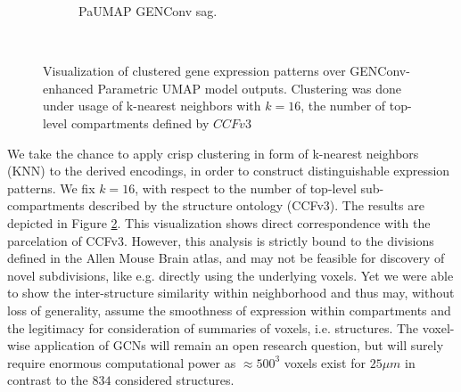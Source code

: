 \documentclass[]{article}
\begin{document}
\begin{figure}
\begin{subfigure}{.28\textwidth}
		\caption{PaUMAP GENConv sag.}
		\label{fig:disc_clustering_sag}
	\end{subfigure}\\
	
	\caption[Visualization of clustered gene expression patterns over GENConv-enhanced Parametric UMAP model outputs]{Visualization of clustered gene expression patterns over GENConv-enhanced Parametric UMAP model outputs. Clustering was done under usage of k-nearest neighbors with $k=16$, the number of top-level compartments defined by $CCFv3$}
	\label{fig:disc_clustering}
\end{figure}


We take the chance to apply crisp clustering in form of k-nearest neighbors (KNN) to the derived encodings, in order to construct distinguishable expression patterns. We fix $k=16$, with respect to the number of top-level sub-compartments described by the structure ontology (CCFv3). The results are depicted in Figure \ref{fig:disc_clustering}. This visualization shows direct correspondence with the parcelation of CCFv3. However, this analysis is strictly bound to the divisions defined in the Allen Mouse Brain atlas, and may not be feasible for discovery of novel subdivisions, like e.g. \citet{takata_flexible_2021} directly using the underlying voxels. Yet we were able to show the inter-structure similarity within neighborhood and thus may, without loss of generality, assume the smoothness of expression within compartments and the legitimacy for consideration of summaries of voxels, i.e. structures. The voxel-wise application of GCNs will remain an open research question, but will surely require enormous computational power as $\approx500^3$ voxels exist for $25 \mu m$ in contrast to the $834$ considered structures.\\



%
%
%	
\end{document}
